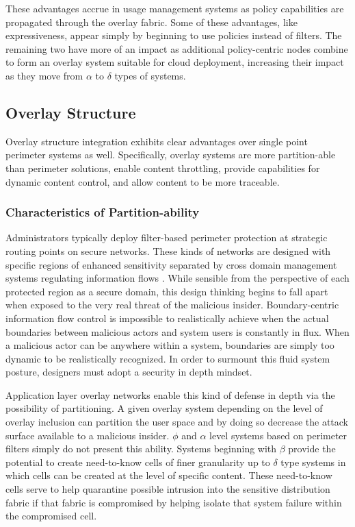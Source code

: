 These advantages accrue in usage management systems as policy capabilities are propagated through the overlay fabric.  Some of these advantages, like expressiveness, appear simply by beginning to use policies instead of filters.  The remaining two have more of an impact as additional policy-centric nodes combine to form an overlay system suitable for cloud deployment, increasing their impact as they move from $\alpha$ to $\delta$ types of systems.

\subsection{Overlay Structure}
Overlay structure integration exhibits clear advantages over single point perimeter systems as well.  Specifically, overlay systems are more partition-able than perimeter solutions, enable content throttling, provide capabilities for dynamic content control, and allow content to be more traceable.

\subsubsection*{Characteristics of Partition-ability}
Administrators typically deploy filter-based perimeter protection at strategic routing points on secure networks.  These kinds of networks are designed with specific regions of enhanced sensitivity separated by cross domain management systems regulating information flows \cite{proposal:nsa-arch,proposal:raytheon-arch,proposal:bah-arch}.  While sensible from the perspective of each protected region as a secure domain, this design thinking begins to fall apart when exposed to the very real threat of the malicious insider.  Boundary-centric information flow control is impossible to realistically achieve when the actual boundaries between malicious actors and system users is constantly in flux.  When a malicious actor can be anywhere within a system, boundaries are simply too dynamic to be realistically recognized.  In order to surmount this fluid system posture, designers must adopt a security in depth mindset.

Application layer overlay networks enable this kind of defense in depth via the possibility of partitioning.  A given overlay system depending on the level of overlay inclusion can partition the user space and by doing so decrease the attack surface available to a malicious insider.  $\phi$ and $\alpha$ level systems based on perimeter filters simply do not present this ability.  Systems beginning with $\beta$ provide the potential to create need-to-know cells of finer granularity up to $\delta$ type systems in which cells can be created at the level of specific content.  These need-to-know cells serve to help quarantine possible intrusion into the sensitive distribution fabric if that fabric is compromised by helping isolate that system failure within the compromised cell.

